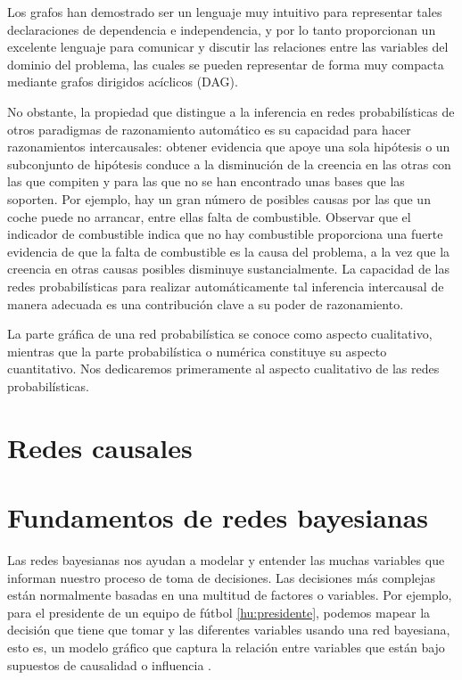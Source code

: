 Los grafos han demostrado ser un lenguaje muy intuitivo para representar
tales declaraciones de dependencia e independencia, y por lo tanto proporcionan un excelente
lenguaje para comunicar y discutir las relaciones entre las 
variables del dominio del problema, las cuales se pueden representar de forma muy compacta 
mediante grafos dirigidos acíclicos (DAG).

No obstante, la propiedad que distingue a la inferencia en redes probabilísticas
de otros paradigmas de razonamiento automático es su capacidad para hacer razonamientos intercausales: 
obtener evidencia que apoye una sola hipótesis o un subconjunto de
hipótesis conduce a la disminución de la creencia en las otras con las que compiten y para las que no se 
han encontrado unas bases que las soporten. Por ejemplo, hay un gran número de posibles causas por las 
que un coche puede no arrancar, entre ellas falta de combustible. Observar que el indicador de combustible 
indica que no hay combustible proporciona una fuerte evidencia de que la falta de combustible es la causa 
del problema, a la vez que la creencia en otras causas posibles disminuye sustancialmente. La capacidad 
de las redes probabilísticas para realizar automáticamente tal inferencia intercausal de manera adecuada 
es una contribución clave a su poder de razonamiento.

La parte gráfica de una red probabilística se conoce como aspecto cualitativo, mientras que la 
parte probabilística o numérica constituye su aspecto cuantitativo. Nos dedicaremos primeramente al aspecto 
cualitativo de las redes probabilísticas.

\section{Redes causales}

\section{Fundamentos de redes bayesianas}
Las redes bayesianas nos ayudan a modelar y entender las muchas variables que informan nuestro proceso de 
toma de decisiones. Las decisiones más complejas están normalmente basadas en una multitud de factores o 
variables. Por ejemplo, para el presidente de un equipo de fútbol \ref{hu:presidente}, podemos 
mapear la decisión que tiene que tomar y las diferentes variables usando 
una red bayesiana, esto es, un modelo gráfico que captura la relación entre variables que están bajo 
supuestos de causalidad o influencia \cite{things-to-know-BN}.

